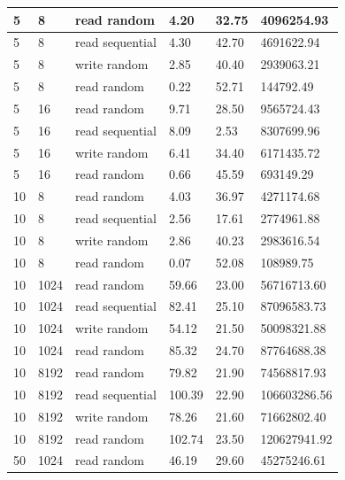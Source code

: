 \begin{tabularx}{\textwidth}{|X|X|X|X|X|X|}
    \hline
    \rowcolor{lightgray} 5 & 8 & read random & 4.20 & 32.75 & 4096254.93 \\
    \hline
    \rowcolor{lightgray} 5 & 8 & read sequential &  4.30 & 42.70 & 4691622.94 \\
    \hline
    \rowcolor{lightgray} 5 & 8 & write random & 2.85 & 40.40 & 2939063.21 \\
    \hline
    \rowcolor{lightgray} 5 & 8 & read random & 0.22 & 52.71 & 144792.49 \\
    \hline
    \hline
    5 & 16 & read random & 9.71 & 28.50 & 9565724.43 \\
    \hline
    5 & 16 & read sequential & 8.09 & 2.53 & 8307699.96 \\
    \hline
    5 & 16 & write random & 6.41 & 34.40 & 6171435.72 \\
    \hline
    5 & 16 & read random & 0.66 & 45.59 & 693149.29 \\
    \hline
    \hline
    \rowcolor{lightgray} 10 & 8 & read random & 4.03 & 36.97 & 4271174.68 \\
    \hline
    \rowcolor{lightgray} 10 & 8 & read sequential & 2.56 & 17.61 & 2774961.88 \\
    \hline
    \rowcolor{lightgray} 10 & 8 & write random & 2.86 & 40.23 & 2983616.54 \\
    \hline
    \rowcolor{lightgray} 10 & 8 & read random & 0.07 & 52.08 & 108989.75 \\
    \hline
    \hline
    10 & 1024 & read random & 59.66 & 23.00 & 56716713.60 \\
    \hline
    10 & 1024 & read sequential & 82.41 & 25.10 & 87096583.73 \\
    \hline
    10 & 1024 & write random & 54.12 & 21.50 & 50098321.88 \\
    \hline
    10 & 1024 & read random & 85.32 & 24.70 & 87764688.38 \\
    \hline
    \hline
    \rowcolor{lightgray} 10 & 8192 & read random & 79.82 & 21.90 & 74568817.93\\
    \hline
    \rowcolor{lightgray} 10 & 8192 & read sequential & 100.39 & 22.90 & 106603286.56 \\
    \hline
    \rowcolor{lightgray} 10 & 8192 & write random & 78.26 & 21.60 & 71662802.40 \\
    \hline
    \rowcolor{lightgray} 10 & 8192 & read random & 102.74 & 23.50 & 120627941.92 \\
    \hline
    \hline
    50 & 1024 & read random & 46.19 & 29.60 & 45275246.61 \\

\end{tabularx}
